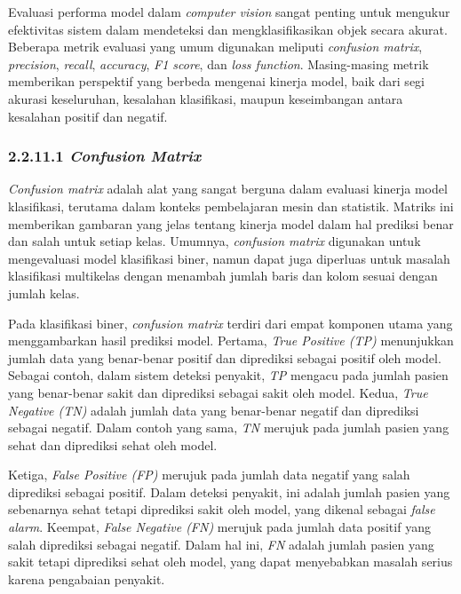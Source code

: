 Evaluasi performa model dalam \emph{computer vision} sangat penting untuk mengukur efektivitas sistem dalam mendeteksi dan mengklasifikasikan objek secara akurat. Beberapa metrik evaluasi yang umum digunakan meliputi \emph{confusion matrix}, \emph{precision}, \emph{recall}, \emph{accuracy}, \emph{F1 score}, dan \emph{loss function}. Masing-masing metrik memberikan perspektif yang berbeda mengenai kinerja model, baik dari segi akurasi keseluruhan, kesalahan klasifikasi, maupun keseimbangan antara kesalahan positif dan negatif.

\subsubsection{2.2.11.1 \emph{Confusion Matrix}}

\emph{Confusion matrix} adalah alat yang sangat berguna dalam evaluasi kinerja model klasifikasi, terutama dalam konteks pembelajaran mesin dan statistik. Matriks ini memberikan gambaran yang jelas tentang kinerja model dalam hal prediksi benar dan salah untuk setiap kelas. Umumnya, \emph{confusion matrix} digunakan untuk mengevaluasi model klasifikasi biner, namun dapat juga diperluas untuk masalah klasifikasi multikelas dengan menambah jumlah baris dan kolom sesuai dengan jumlah kelas.

Pada klasifikasi biner, \emph{confusion matrix} terdiri dari empat komponen utama yang menggambarkan hasil prediksi model. Pertama, \emph{True Positive (TP)} menunjukkan jumlah data yang benar-benar positif dan diprediksi sebagai positif oleh model. Sebagai contoh, dalam sistem deteksi penyakit, \emph{TP} mengacu pada jumlah pasien yang benar-benar sakit dan diprediksi sebagai sakit oleh model. Kedua, \emph{True Negative (TN)} adalah jumlah data yang benar-benar negatif dan diprediksi sebagai negatif. Dalam contoh yang sama, \emph{TN} merujuk pada jumlah pasien yang sehat dan diprediksi sehat oleh model.

Ketiga, \emph{False Positive (FP)} merujuk pada jumlah data negatif yang salah diprediksi sebagai positif. Dalam deteksi penyakit, ini adalah jumlah pasien yang sebenarnya sehat tetapi diprediksi sakit oleh model, yang dikenal sebagai \emph{false alarm}. Keempat, \emph{False Negative (FN)} merujuk pada jumlah data positif yang salah diprediksi sebagai negatif. Dalam hal ini, \emph{FN} adalah jumlah pasien yang sakit tetapi diprediksi sehat oleh model, yang dapat menyebabkan masalah serius karena pengabaian penyakit.

